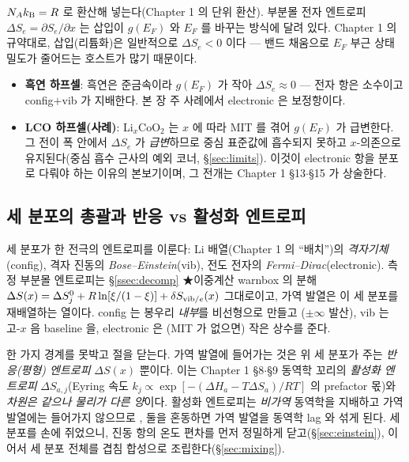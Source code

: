 $N_Ak_{\mathrm B}=R$ 로 환산해 넣는다(Chapter 1 의 단위 환산). 부분몰 전자 엔트로피 $\Delta S_e=\partial S_e/\partial x$
는 삽입이 $g(E_F)$ 와 $E_F$ 를 바꾸는 방식에 달려 있다. Chapter 1 의 규약대로, 삽입(리튬화)은 일반적으로
$\Delta S_e<0$ 이다 --- 밴드 채움으로 $E_F$ 부근 상태밀도가 줄어드는 호스트가 많기 때문이다.
\begin{itemize}[leftmargin=1.4em,itemsep=1pt]
\item \textbf{흑연 하프셀}: 흑연은 준금속이라 $g(E_F)$ 가 작아 $\Delta S_e\approx0$ --- 전자 항은 소수이고
config$+$vib 가 지배한다. 본 장 주 사례에서 electronic 은 보정항이다.
\item \textbf{LCO 하프셀(사례)}: Li$_x$CoO$_2$ 는 $x$ 에 따라 MIT 를 겪어 $g(E_F)$ 가 급변한다. 그 전이 폭
안에서 $\Delta S_e$ 가 \emph{급변}하므로 중심 표준값에 흡수되지 못하고 $x$-의존으로 유지된다(중심 흡수 근사의
예외 코너, \S\ref{sec:limits}). 이것이 electronic 항을 분포로 다뤄야 하는 이유의 본보기이며, 그 전개는
Chapter 1 §13$\cdot$§15 가 상술한다.
\end{itemize}

\subsection{세 분포의 총괄과 반응 vs 활성화 엔트로피}\label{ssec:threedist}
\begin{keybox}
세 분포가 한 전극의 엔트로피를 이룬다: Li 배열(Chapter 1 의 ``배치'')의 \emph{격자기체}(config), 격자 진동의
\emph{Bose--Einstein}(vib), 전도 전자의 \emph{Fermi--Dirac}(electronic). 측정 부분몰 엔트로피는
\S\ref{ssec:decomp} ★이중계산 warnbox 의 분해 $\Delta S(x)=\Delta S^0_j+R\ln[\xi/(1-\xi)]+\delta S_{\mathrm{vib}/e}(x)$
그대로이고, 가역 발열은 이 세 분포를 재배열하는 열이다. config 는 봉우리 \emph{내부}를 비선형으로 만들고
($\pm\infty$ 발산), vib 는 고-$x$ 음 baseline 을, electronic 은 (MIT 가 없으면) 작은 상수를 준다.
\end{keybox}

한 가지 경계를 못박고 절을 닫는다. 가역 발열에 들어가는 것은 위 세 분포가 주는 \emph{반응(평형) 엔트로피}
$\Delta S(x)$ 뿐이다. 이는 Chapter 1 §8$\cdot$§9 동역학 꼬리의 \emph{활성화 엔트로피} $\Delta S_{a,j}$(Eyring
속도 $k_j\propto\exp[-(\Delta H_a-T\Delta S_a)/RT]$ 의 prefactor 몫)와 \emph{차원은 같으나 물리가 다른
양}이다. 활성화 엔트로피는 \emph{비가역} 동역학을 지배하고 가역 발열에는 들어가지 않으므로 \cite{msmr_partI},
둘을 혼동하면 가역 발열을 동역학 lag 와 섞게 된다. 세 분포를 손에 쥐었으니, 진동 항의 온도 편차를 먼저
정밀하게 닫고(\S\ref{sec:einstein}), 이어서 세 분포 전체를 겹침 합성으로 조립한다(\S\ref{sec:mixing}).


